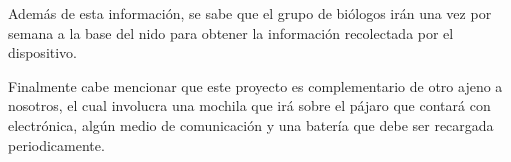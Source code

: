 Además de esta información, se sabe que el grupo de biólogos irán una vez por semana a la base del nido para obtener la información recolectada por el dispositivo.


Finalmente cabe mencionar que este proyecto es complementario de otro ajeno a nosotros, el cual involucra una mochila que irá sobre el pájaro que contará con electrónica, algún medio de comunicación y una batería que debe ser recargada periodicamente.


%